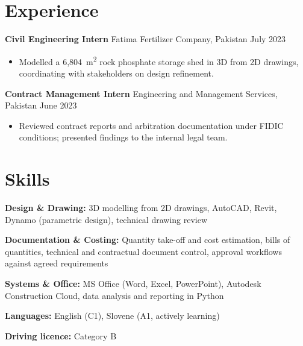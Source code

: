 \documentclass[a4paper,10.5pt]{article}
\newcommand{\datefill}{\dotfill}
\newcommand{\entry}[3]{\vspace{2.5pt}\noindent\textbf{#1} \textbar{} #2 \datefill{} #3\par\vspace{0.5pt}}
\newcommand{\skillrow}[2]{\noindent\textbf{#1:} #2\par\vspace{1pt}}
\begin{document}
\section{Experience}
\entry{Civil Engineering Intern}{Fatima Fertilizer Company, Pakistan}{July 2023}
\begin{itemize}
  \item Modelled a 6,804~m\textsuperscript{2} rock phosphate storage shed in 3D from
        2D drawings, coordinating with stakeholders on design refinement.
\end{itemize}

\entry{Contract Management Intern}{Engineering and Management Services, Pakistan}{June 2023}
\begin{itemize}
  \item Reviewed contract reports and arbitration documentation under FIDIC
        conditions; presented findings to the internal legal team.
\end{itemize}

\section{Skills}

\skillrow{Design \& Drawing}{3D modelling from 2D drawings, AutoCAD, Revit, Dynamo (parametric design), technical drawing review}
\skillrow{Documentation \& Costing}{Quantity take-off and cost estimation, bills of quantities, technical and contractual document control, approval workflows against agreed requirements}
\skillrow{Systems \& Office}{MS Office (Word, Excel, PowerPoint), Autodesk Construction Cloud, data analysis and reporting in Python}

\skillrow{Languages}{English (C1), Slovene (A1, actively learning)}
\skillrow{Driving licence}{Category B}
\end{document}
